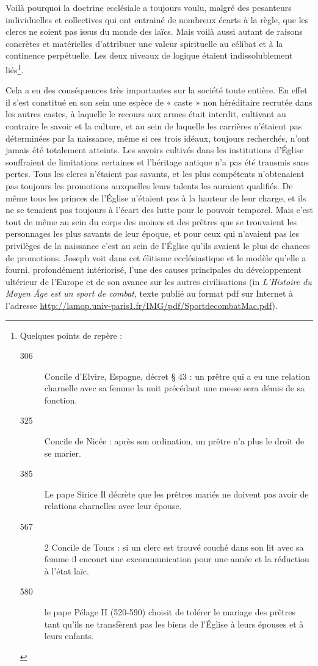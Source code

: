 Voilà pourquoi la doctrine ecclésiale a toujours voulu, malgré des pesanteurs individuelles et collectives qui ont entrainé de nombreux écarts à la règle, que les clercs ne soient pas issus du monde des laïcs. Mais voilà aussi autant de raisons concrètes et matérielles d'attribuer une valeur spirituelle au célibat et à la continence perpétuelle. Les deux niveaux de logique étaient indissolublement liés\footnote{Quelques points de repère :
\begin{description}
\item[306] Concile d’Elvire, Espagne, décret § 43 : un prêtre qui a eu une relation charnelle avec sa femme la nuit précédant une messe sera démis de sa fonction.
\item[325] Concile de Nicée : après son ordination, un prêtre n'a plus le droit de se marier.
\item[385] Le pape Sirice Il  décrète que les prêtres mariés ne doivent pas avoir de relations charnelles avec leur épouse.
\item[567] 2\ieme{} Concile de Tours : si un clerc est trouvé couché dans son lit avec sa femme il encourt une excommunication pour une année et la réduction à l’état laïc.
\item[580] le pape Pélage II (520-590) choisit de tolérer le mariage des prêtres tant qu'ils ne transfèrent pas les biens de l'Église à leurs épouses et à leurs enfants.
\end{description}%
}.
 
 Cela a eu des conséquences très importantes sur la société toute entière. En effet il s'est constitué en son sein une espèce de « caste » non héréditaire recrutée dans les autres castes, à laquelle le recours aux armes était interdit, cultivant au contraire le savoir et la culture, et au sein de laquelle les carrières n'étaient pas déterminées par la naissance, même si ces trois idéaux, toujours recherchés, n'ont jamais été totalement atteints. Les savoirs cultivés dans les institutions d'Église souffraient de limitations certaines et l'héritage antique n'a pas été transmis sans pertes. Tous les clercs n'étaient pas savants, et les plus compétents n'obtenaient pas toujours les promotions auxquelles leurs talents les auraient qualifiés. De même tous les princes de l'Église n'étaient pas à la hauteur de leur charge, et ils ne se tenaient pas toujours à l'écart des lutte pour le pouvoir temporel. Mais c'est tout de même au sein du corps des moines et des prêtres que se trouvaient les personnages les plus savants de leur époque, et pour ceux qui n'avaient pas les privilèges de la naissance c'est au sein de l'Église qu'ils avaient le plus de chances de promotions. Joseph  voit dans cet élitisme ecclésiastique et le modèle qu'elle a fourni, profondément intériorisé, l'une des causes principales du développement ultérieur de l'Europe et de son avance sur les autres civilisations (in \emph{L'Histoire du Moyen Âge est un sport de combat}, texte publié au format pdf sur Internet à l'adresse \url{http://lamop.univ-paris1.fr/IMG/pdf/SportdecombatMac.pdf}).
 
